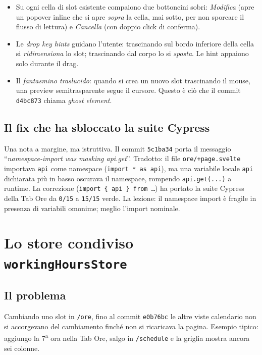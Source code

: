 \begin{itemize}
  \item Su ogni cella di slot esistente compaiono due bottoncini
    sobri: \emph{Modifica} (apre un popover inline che si apre
    \emph{sopra} la cella, mai sotto, per non sporcare il flusso
    di lettura) e \emph{Cancella} (con doppio click di
    conferma).
  \item Le \emph{drop key hints} guidano l'utente: trascinando
    sul bordo inferiore della cella si \emph{ridimensiona} lo
    slot; trascinando dal corpo lo si \emph{sposta}. Le hint
    appaiono solo durante il drag.
  \item Il \emph{fantasmino traslucido}: quando si crea un nuovo
    slot trascinando il mouse, una preview semitrasparente segue
    il cursore. Questo \`e ci\`o che il commit \texttt{d4bc873}
    chiama \emph{ghost element}.
\end{itemize}

\subsection{Il fix che ha sbloccato la suite Cypress}

Una nota a margine, ma istruttiva. Il commit \texttt{5c1ba34}
porta il messaggio ``\emph{namespace-import was masking api.get}''.
Tradotto: il file \texttt{ore/+page.svelte} importava
\texttt{api} come namespace (\texttt{import * as api}), ma una
variabile locale \texttt{api} dichiarata pi\`u in basso oscurava
il namespace, rompendo \texttt{api.get(...)} a runtime. La
correzione (\texttt{import \{ api \} from \dots}) ha portato la
suite Cypress della Tab Ore da \texttt{0/15} a \texttt{15/15}
verde. La lezione: il namespace import \`e fragile in presenza
di variabili omonime; meglio l'import nominale.

\section{Lo store condiviso \texttt{workingHoursStore}}
\label{sec:store-condiviso}

\subsection{Il problema}

Cambiando uno slot in \texttt{/ore}, fino al commit
\texttt{e0b76bc} le altre viste calendario non si accorgevano
del cambiamento finch\'e non si ricaricava la pagina. Esempio
tipico: aggiungo la 7\textsuperscript{a} ora nella Tab Ore, salgo
in \texttt{/schedule} e la griglia mostra ancora sei colonne.

